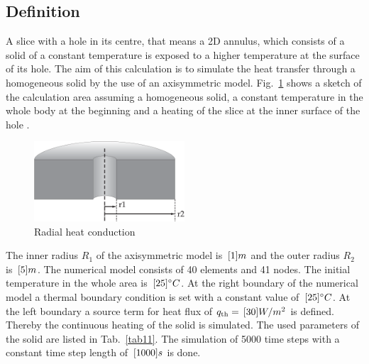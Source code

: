 \subsection{Definition}

A slice with a hole in its centre, that means a 2D annulus, which consists of a solid of a constant temperature is exposed to a higher temperature at the surface of its hole. The aim of this calculation is to simulate the heat transfer through a homogeneous solid by the use of an axisymmetric model. Fig.~\ref{figT1} shows a sketch of the calculation area assuming a homogeneous solid, a constant temperature in the whole body at the beginning and a heating of the slice at the inner surface of the hole .

\begin{figure}[!htbp]
\centering
\includegraphics[width=0.5\textwidth]{PART_II/T/radial-heat-transport.eps}
\caption{\label{figT1}Radial heat conduction}
\end{figure}

%

The inner radius $R_1$ of the axisymmetric model is $\, \mathrm{[}1]{m}$ and the outer radius $R_2$ is $\, \mathrm{[}5]{m}$. The numerical model consists of 40 elements and 41 nodes. The initial temperature in the whole area is $\, \mathrm{[}25]{^{\circ}C}$. At the right boundary of the numerical model a thermal boundary condition is set with a constant value of $\, \mathrm{[}25]{^{\circ}C}$. At the left boundary a source term for heat flux of $q_{\mathrm{th}}=\, \mathrm{[}30]{W/m^2}$ is defined. Thereby the continuous heating of the solid is simulated. The used parameters of the solid are listed in Tab.~\ref{tab11}. The simulation of 5000 time steps with a constant time step length of $\, \mathrm{[}1000]{s}$ is done.

